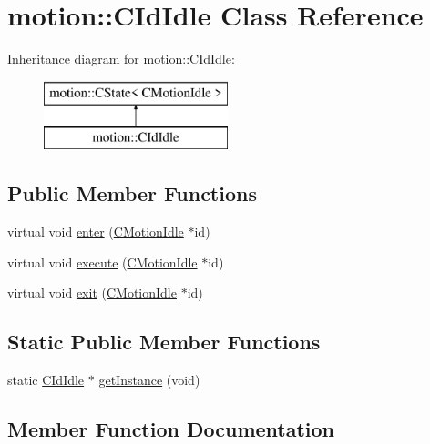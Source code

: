 \hypertarget{classmotion_1_1CIdIdle}{}\section{motion\+:\+:C\+Id\+Idle Class Reference}
\label{classmotion_1_1CIdIdle}
Inheritance diagram for motion\+:\+:C\+Id\+Idle\+:\begin{figure}[H]
\begin{center}
\leavevmode
\includegraphics[height=2.000000cm]{classmotion_1_1CIdIdle}
\end{center}
\end{figure}
\subsection*{Public Member Functions}
\begin{DoxyCompactItemize}
\item 
virtual void \mbox{\hyperlink{classmotion_1_1CIdIdle_a14a7339e10f93b2725b6edfb66583ca7}{enter}} (\mbox{\hyperlink{classmotion_1_1CMotionIdle}{C\+Motion\+Idle}} $\ast$id)
\item 
virtual void \mbox{\hyperlink{classmotion_1_1CIdIdle_a157fe57e41c2a53bb5bbd444a74636bd}{execute}} (\mbox{\hyperlink{classmotion_1_1CMotionIdle}{C\+Motion\+Idle}} $\ast$id)
\item 
virtual void \mbox{\hyperlink{classmotion_1_1CIdIdle_aa54a27090c4f10a9a2c5130d9baf14a3}{exit}} (\mbox{\hyperlink{classmotion_1_1CMotionIdle}{C\+Motion\+Idle}} $\ast$id)
\end{DoxyCompactItemize}
\subsection*{Static Public Member Functions}
\begin{DoxyCompactItemize}
\item 
static \mbox{\hyperlink{classmotion_1_1CIdIdle}{C\+Id\+Idle}} $\ast$ \mbox{\hyperlink{classmotion_1_1CIdIdle_ad2a189a219ab9030d99b46a286761b63}{get\+Instance}} (void)
\end{DoxyCompactItemize}


\subsection{Member Function Documentation}
\mbox{\label{classmotion_1_1CIdIdle_a14a7339e10f93b2725b6edfb66583ca7}} 

